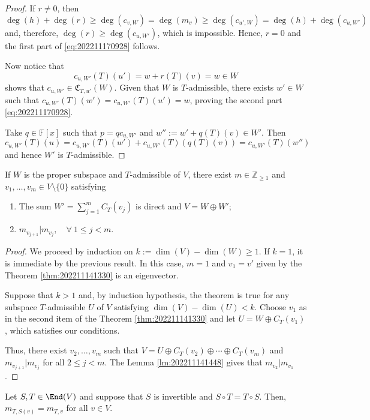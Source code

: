 \begin{proof}
  If $r \neq 0$, then $\deg(h) + \deg(r) \geq \deg(c_{v,W}) = \deg(m_v) \geq \deg(c_{u',W}) = \deg(h) + \deg(c_{u,W'})$ and, therefore, $\deg(r) \geq \deg(c_{u,W'})$, which is impossible. Hence, $r = 0$ and the first part of \eqref{eq:202211170928} follows.
  
  Now notice that
  \[
  	c_{u,W'}(T)(u') = w + r(T)(v) = w \in W
  \]
  shows that $c_{u,W'} \in \mathfrak{C}_{T, u'}(W)$. Given that $W$ is $T$-admissible, there exists $w' \in W$ such that $c_{u,W'}(T)(w') = c_{u,W'}(T)(u') = w$, proving the second part \eqref{eq:202211170928}.

  Take $q \in \mathbb{F}[x]$ such that $p = q c_{u,W'}$ and $w'' := w' + q(T)(v) \in W'$. Then
  \[
    c_{u,W'}(T)(u) = c_{u, W'}(T)(w') + c_{u, W'}(T)(q(T)(v)) = c_{u,W'}(T)(w'')
  \]
  and hence $W'$ is $T$-admissible.
\end{proof}

\begin{theorem}
	If $W$ is the proper subspace and $T$-admissible of $V$, there exist $m \in \mathbb{Z}_{\geq 1}$ and $v_1, \ldots, v_m \in V \setminus \{ 0 \}$ satisfying
	\begin{enumerate}
		\item The sum $W' = \sum_{j=1}^m C_T(v_j)$ is direct and $V = W \oplus W'$;
		\item $m_{v_{j+1}} | m_{v_j}, \quad \forall ~1 \leq j < m$.
	\end{enumerate}
\end{theorem}

\begin{proof}
	We proceed by induction on $k := \dim(V) - \dim(W) \geq 1$. If $k = 1$, it is immediate by the previous result. In this case, $m = 1$ and $v_1 = v'$ given by the Theorem \ref{thm:202211141330} is an eigenvector.
	
	Suppose that $k > 1$ and, by induction hypothesis, the theorem is true for any subspace $T$-admissible $U$ of $V$ satisfying $\dim(V) - \dim(U) < k$. Choose $v_1$ as in the second item of the Theorem \ref{thm:202211141330} and let $U = W \oplus C_T(v_1)$, which satisfies our conditions.
	
	Thus, there exist $v_2, \ldots, v_m$ such that $V = U \oplus C_T(v_2) \oplus \cdots \oplus C_T(v_m)$ and $m_{v_{j+1}} | m_{v_j}$ for all $2 \leq j < m$. The Lemma \ref{lm:202211141448} gives that $m_{v_2} | m_{v_1}$.
\end{proof}

\begin{lemma}\label{lm:202211170945}
	Let $S, T \in \End(V)$ and suppose that $S$ is invertible and $S \circ T = T \circ S$. Then, $m_{T,S(v)} = m_{T,v}$ for all $v \in V$.
\end{lemma}

